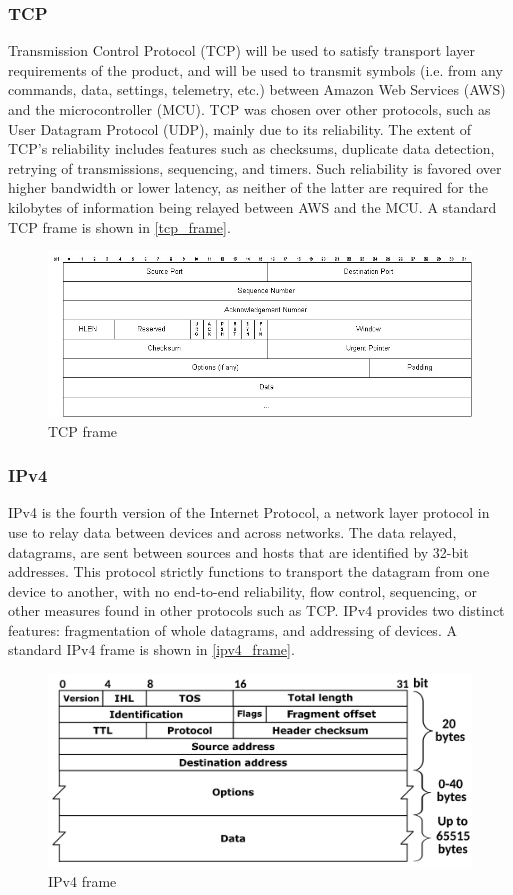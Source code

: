 \subsubsection{TCP} \label{tcp_standard} Transmission Control Protocol (TCP) will be used to satisfy transport layer
requirements of the product, and will be used to transmit symbols (i.e.
from any commands, data, settings, telemetry, etc.) between Amazon Web
Services (AWS) and the microcontroller (MCU). TCP was chosen over other
protocols, such as User Datagram Protocol (UDP), mainly due to its
reliability. The extent of TCP's reliability includes features such as
checksums, duplicate data detection, retrying of transmissions, sequencing,
and timers.
Such reliability is favored over higher bandwidth or lower
latency, as neither of the latter are required for the kilobytes
of information being relayed between AWS and the MCU. A standard TCP frame
is shown in \autoref{tcp_frame}.
\begin{figure}[H]
    \caption{TCP frame \cite{Kristoff}}
    \label{tcp_frame}
    \centering
    \includegraphics[width=\textwidth]{images/tcp_frame.jpg}
\end{figure}


\subsubsection{IPv4} IPv4 is the fourth version of the Internet Protocol, a network layer protocol in use to relay data between devices and across networks. The data relayed, datagrams, are sent between sources and hosts that are identified by 32-bit addresses. This protocol strictly functions to transport the datagram from one device to another, with no end-to-end reliability, flow control, sequencing, or other measures found in other protocols such as TCP. IPv4 provides two distinct features: fragmentation of whole datagrams, and addressing of devices. A standard IPv4 frame is shown in \autoref{ipv4_frame}.
\begin{figure}[H]
    \caption{IPv4 frame \cite{Postel1981}}
    \label{ipv4_frame}
    \centering
    \includegraphics[width=\textwidth]{images/ipv4_frame.png}
\end{figure}